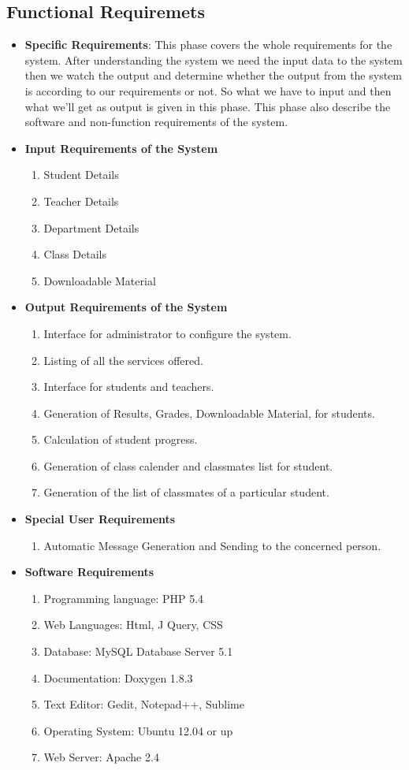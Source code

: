 \subsection{Functional Requiremets}
\begin{itemize}
\item {\bf Specific Requirements}: This phase covers the whole requirements 
for the system. After understanding the system we need the input data 
to the system then we watch the output and determine whether the output 
from the system is according to our requirements or not. So what we have 
to input and then what we’ll get as output is given in this phase. This 
phase also describe the software and non-function requirements of the 
system.
\item {\bf Input Requirements of the System}
\begin{enumerate} 
\item Student Details
\item Teacher Details
\item Department Details
\item Class Details
\item Downloadable Material 
\end{enumerate}
\vskip 0.5cm
\item {\bf Output Requirements of the System}
\begin{enumerate} 
\item Interface for administrator to configure the system.
\item Listing of all the services offered.
\item Interface for students and teachers.
\item Generation of Results, Grades, Downloadable Material,
for students.
\item Calculation of student progress.
\item Generation of class calender and classmates list for student.
\item Generation of the list of classmates of a particular student.
\end{enumerate}
\vskip 0.5cm
\item {\bf Special User Requirements}
\begin{enumerate} 
\item Automatic Message Generation and Sending to the concerned person.
\end{enumerate}
\vskip 0.5cm
\item {\bf Software Requirements}
\begin{enumerate} 
\item Programming language: PHP 5.4
\item Web Languages: Html, J Query, CSS 
\item Database: MySQL Database Server 5.1 
\item Documentation: Doxygen 1.8.3
\item Text Editor: Gedit, Notepad++, Sublime
\item Operating System: Ubuntu 12.04 or up
\item Web Server: Apache 2.4
\end{enumerate}
\vskip 0.5cm

\end{itemize}
